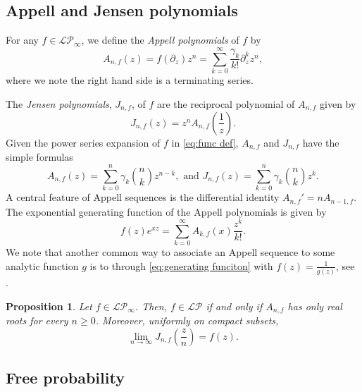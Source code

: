 \documentclass[reqno]{amsart}
\newcommand{\1}{\mathbf{1}}
\newcommand{\LP}{\mathcal{LP}}
\theoremstyle{plain}
\newtheorem{proposition}[theorem]{Proposition}
\theoremstyle{definition}
\theoremstyle{remark}
\numberwithin{equation}{section}
\begin{document}
\subsection{Appell and Jensen polynomials}
	For any $f\in\LP_{\infty}$, we define the \emph{Appell polynomials} of $f$ by \begin{equation}\label{eq:Appell def}
		A_{n,f}(z)=f(\partial_{z})z^{n}=\sum_{k=0}^{\infty}\frac{\gamma_{k}}{k!}\partial_{z}^{k}z^{n},
	\end{equation} where we note the right hand side is a terminating series. 
	
	The  \emph{Jensen polynomials}, $J_{n,f}$, of $f$ are the reciprocal polynomial of $A_{n,f}$ given by\begin{equation}\label{eq:J and A inversion}
	J_{n,f}(z)=z^{n}A_{n,f}\left(\frac{1}{z}\right).
\end{equation} Given the power series expansion of $f$ in \eqref{eq:func def}, $A_{n,f}$ and $J_{n,f}$ have the simple formulas \begin{equation}\label{eq:formulas for A and J}
	A_{n,f}(z)=\sum_{k=0}^{n}\gamma_{k}\binom{n}{k}z^{n-k},\text{ and }
	J_{n,f}(z)=\sum_{k=0}^{n}\gamma_{k}\binom{n}{k}z^{k}.
\end{equation} A central feature of Appell sequences is the differential identity $A_{n,f}'=nA_{n-1,f}$. The exponential generating function of the Appell polynomials is given by \begin{equation}\label{eq:generating funciton}
f(z)e^{xz}=\sum_{k=0}^{\infty}A_{k,f}(x)\frac{z^k}{k!}.
\end{equation} We note that another common way to associate an Appell sequence to some analytic function $g$ is to through \eqref{eq:generating funciton} with $f(z)=\frac{1}{g(z)}$, see \cite{boyer2010appell,buric2016appell,salas2020appell,Anshelevich2004,Anshelevich2009,Anshelevich2009part3}.

\begin{proposition}\label{prop:Jensen polynomial convergence}
Let $f\in\LP_{\infty}$. Then, $f\in\LP$ if and only if $A_{n,f}$ has only real roots for every $n\geq 0$. Moreover,  uniformly on compact subsets, \begin{equation}
	\lim\limits_{n\rightarrow\infty}J_{n,f}\left(\frac{z}{n}\right)=f(z).
\end{equation}
\end{proposition} 

\subsection{Free probability}\label{subsec:free prob}
\end{document}
